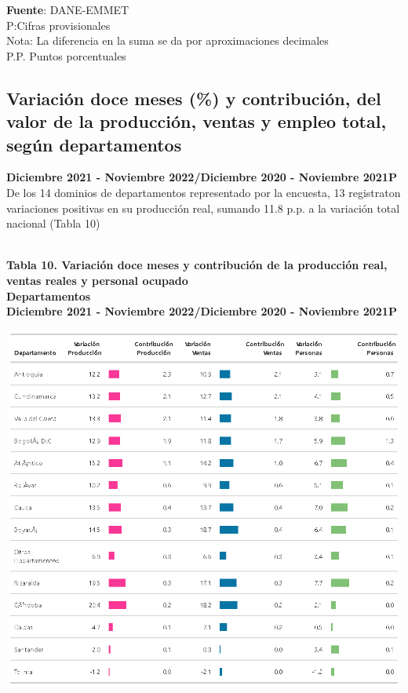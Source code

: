 \documentclass[
]{article}
\begin{document}
\textbf{Fuente}: DANE-EMMET\\
P:Cifras provisionales\\
Nota: La diferencia en la suma se da por aproximaciones decimales\\
P.P. Puntos porcentuales\\

\hypertarget{variaciuxf3n-doce-meses-y-contribuciuxf3n-del-valor-de-la-producciuxf3n-ventas-y-empleo-total-seguxfan-departamentos}{%
\subsection{Variación doce meses (\%) y contribución, del valor de la
producción, ventas y empleo total, según
departamentos}\label{variaciuxf3n-doce-meses-y-contribuciuxf3n-del-valor-de-la-producciuxf3n-ventas-y-empleo-total-seguxfan-departamentos}}

\textbf{Diciembre 2021 - Noviembre 2022/Diciembre 2020 - Noviembre
2021P}\\

De los 14 dominios de departamentos representado por la encuesta, 13
registraton variaciones positivas en su producción real, sumando 11.8
p.p. a la variación total nacional (Tabla 10)\\
\strut \\
\textbf{Tabla 10. Variación doce meses y contribución de la producción
real, ventas reales y personal ocupado}\\
\textbf{Departamentos}\\
\textbf{Diciembre 2021 - Noviembre 2022/Diciembre 2020 - Noviembre
2021P}\\

\begin{center}\includegraphics[width=12.58in]{tabla10_1} \end{center}
\end{document}
